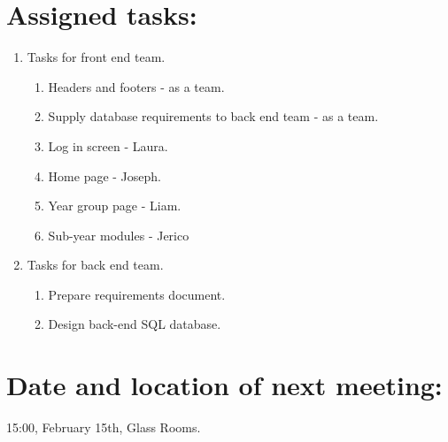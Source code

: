 \documentclass[a4paper, 12pt]{article}
\begin{document}
	\section{Assigned tasks:}
		\begin{enumerate}[label*=\arabic*.]
			\item Tasks for front end team.
			\begin{enumerate}[label*=\arabic*.]
				\item Headers and footers - as a team.
				\item Supply database requirements to back end team - as a team.
				\item Log in screen - Laura.
				\item Home page - Joseph.
				\item Year group page - Liam.
				\item Sub-year modules - Jerico
			\end{enumerate}
			\item Tasks for back end team.
			\begin{enumerate}[label*=\arabic*.]
				\item Prepare requirements document.
				\item Design back-end SQL database.
			\end{enumerate}
		\end{enumerate}

	\section{Date and location of next meeting:}
		15:00, February 15th, Glass Rooms.
\end{document}
